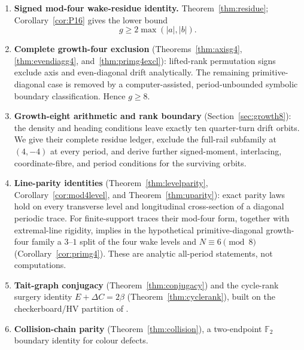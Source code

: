 \documentclass[11pt,letterpaper]{article}
\theoremstyle{plain}
\theoremstyle{definition}
\newcommand{\F}{\mathbb{F}}
\newcommand{\growth}{g}
\begin{document}
\begin{NoHyper}
\begin{enumerate}[leftmargin=2.4em,label=\textbf{(\arabic*)}]
\item \textbf{Signed mod-four wake-residue identity.}
Theorem~\ref{thm:residue}; Corollary~\ref{cor:P16} gives the lower bound
\[
\growth\ge2\max(|a|,|b|).
\]

\item \textbf{Complete growth-four exclusion}
(Theorems~\ref{thm:axisg4}, \ref{thm:evendiagg4}, and~\ref{thm:primg4excl}):
lifted-rank permutation signs exclude axis and even-diagonal drift analytically.
The remaining primitive-diagonal case is removed by a computer-assisted,
period-unbounded symbolic boundary classification.  Hence $\growth\ge8$.

\item \textbf{Growth-eight arithmetic and rank boundary}
(Section~\ref{sec:growth8}): the density and heading conditions leave exactly ten
quarter-turn drift orbits.  We give their complete residue ledger, exclude the
full-rail subfamily at $(4,-4)$ at every period, and derive further signed-moment,
interlacing, coordinate-fibre, and period conditions for the surviving orbits.

\item \textbf{Line-parity identities} (Theorem~\ref{thm:levelparity},
Corollary~\ref{cor:mod4level}, and Theorem~\ref{thm:uparity}): exact parity laws
hold on every transverse level and longitudinal cross-section of a diagonal
periodic trace. For finite-support traces their mod-four form, together with
extremal-line rigidity, implies in the hypothetical primitive-diagonal growth-four
family a $3$--$1$ split of the four wake levels and $N\equiv6\pmod8$
(Corollary~\ref{cor:primg4}). These are analytic
all-period statements, not computations.

\item \textbf{Tait-graph conjugacy} (Theorem~\ref{thm:conjugacy}) and the cycle-rank
surgery identity $E+\Delta C=2\beta$ (Theorem~\ref{thm:cyclerank}), built on the
checkerboard/HV partition of \cite{GaleProppSutnerTroubetzkoy1995}.

\item \textbf{Collision-chain parity} (Theorem~\ref{thm:collision}), a two-endpoint
$\F_2$ boundary identity for colour defects.


\end{enumerate}
\end{NoHyper}
\end{document}
